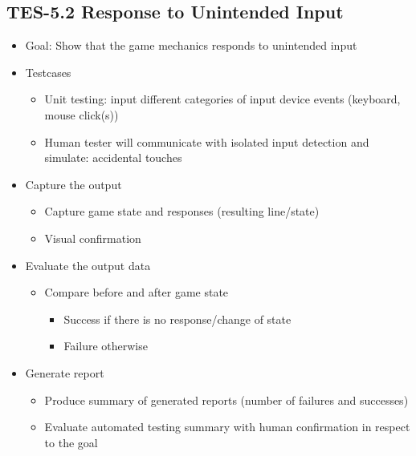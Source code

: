 \subsection{TES-5.2 Response to Unintended Input}
\begin{itemize}
\item Goal: Show that the game mechanics responds to unintended input

\item Testcases
\begin{itemize}
\item Unit testing: input different categories of input device events (keyboard, mouse click(s))
\item Human tester will communicate with isolated input detection and simulate: accidental touches
\end{itemize}

\item Capture the output
\begin{itemize}
\item Capture game state and responses (resulting line/state)
\item Visual confirmation
\end{itemize}

\item Evaluate the output data
\begin{itemize}
\item Compare before and after game state
\begin{itemize}
\item Success if there is no response/change of state
\item Failure otherwise
\end{itemize}
\end{itemize}

\item Generate report
\begin{itemize}
\item Produce summary of generated reports (number of failures and successes)
\item Evaluate automated testing summary with human confirmation in respect to the goal
\end{itemize}
\end{itemize}


